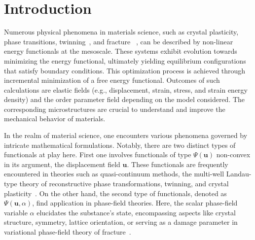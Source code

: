 

\section{Introduction}
Numerous physical phenomena in materials science, such as crystal plasticity, phase transitions, twinning~\cite{Clayton2011-xq}, and fracture ~\cite{Baldelli2014-ho,Baldelli2021-gc}, can be described by non-linear energy functionals at the mesoscale. These systems exhibit evolution towards minimizing the energy functional, ultimately yielding equilibrium configurations that satisfy boundary conditions. This optimization process is achieved through incremental minimization of a free energy functional. Outcomes of such calculations are elastic fields
(e.g., displacement, strain, stress, and strain energy density) and the order parameter field depending on the model considered. The corresponding microstructures are crucial to understand and improve the mechanical behavior of materials.

In the realm of material science, one encounters various phenomena governed by intricate mathematical formulations. Notably, there are two distinct types of functionals at play here. First one involves functionals of type $\Psi(\mathbf u)$ non-convex in its argument, the displacement field $\mathbf u$. These functionals are frequently encountered in theories such as quasi-continuum methods, the multi-well Landau-type theory of reconstructive phase transformations, twinning, and crystal plasticity~\cite{Tadmor1996-qi,Conti2004-yj,Clayton2011-xq,Baggio2019-rs,Baggio2023-qu}. On the other hand, the second type of functionals, denoted as $\Psi(\mathbf u, \alpha)$, find application in phase-field theories. Here, the scalar phase-field variable $\alpha$ elucidates the substance's state, encompassing aspects like crystal structure, symmetry, lattice orientation, \cite{Finel2010-zw,Ruffini2015-pn,Javanbakht2016-dr} or serving as a damage parameter in variational phase-field theory of fracture~\cite{francfort_marigo1998,Salman2021-mn}. 

